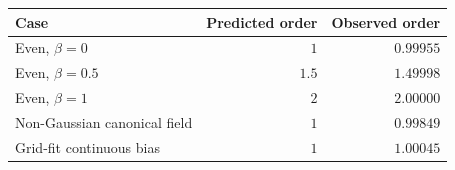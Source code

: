 \begin{tabular}{lrr}
\toprule
Case & Predicted order & Observed order \\
\midrule
Even, $\beta=0$ & $1$ & $0.99955$ \\
Even, $\beta=0.5$ & $1.5$ & $1.49998$ \\
Even, $\beta=1$ & $2$ & $2.00000$ \\
Non-Gaussian canonical field & $1$ & $0.99849$ \\
Grid-fit continuous bias & $1$ & $1.00045$ \\
\bottomrule
\end{tabular}
